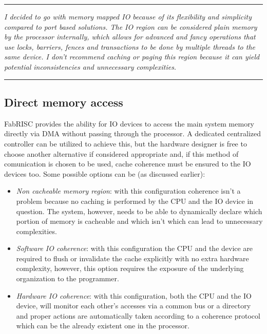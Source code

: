 \documentclass{article}
\begin{document}
        \par\noindent\rule{\textwidth}{0.4pt}
        \textit{I decided to go with memory mapped IO because of its flexibility and simplicity compared to port based solutions. The IO region can be considered plain memory by the processor internally, which allows for advanced and fancy operations that use locks, barriers, fences and transactions to be done by multiple threads to the same device. I don't recommend caching or paging this region because it can yield potential inconsistencies and unnecessary complexities.}
        \par\noindent\rule{\textwidth}{0.4pt}


        \subsection{Direct memory access}

            FabRISC provides the ability for IO devices to access the main system memory directly via DMA without passing through the processor. A dedicated centralized controller can be utilized to achieve this, but the hardware designer is free to choose another alternative if considered appropriate and, if this method of comunication is chosen to be used, cache coherence must be ensured to the IO devices too. Some possible options can be (as discussed earlier):

            \begin{itemize}

                \item \textit{Non cacheable memory region}: with this configuration coherence isn't a problem because no caching is performed by the CPU and the IO device in question. The system, however, needs to be able to dynamically declare which portion of memory is cacheable and which isn't which can lead to unnecessary complexities.
                \item \textit{Software IO coherence}: with this configuration the CPU and the device are required to flush or invalidate the cache explicitly with no extra hardware complexity, however, this option requires the exposure of the underlying organization to the programmer.
                \item \textit{Hardware IO coherence}: with this configuration, both the CPU and the IO device, will monitor each other's accesses via a common bus or a directory and proper actions are automatically taken according to a coherence protocol which can be the already existent one in the processor.

            \end{itemize}
\end{document}
